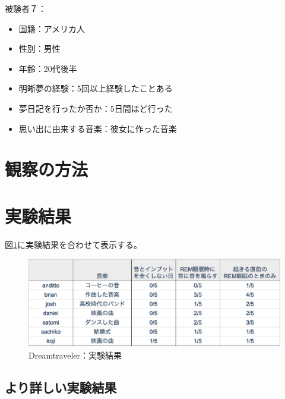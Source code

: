 被験者７：
\begin{itemize}
\item 国籍：アメリカ人
\item 性別：男性
\item 年齢：20代後半
\item 明晰夢の経験：5回以上経験したことある
\item 夢日記を行ったか否か：5日間ほど行った
\item 思い出に由来する音楽：彼女に作った音楽
\end{itemize}

\section{観察の方法}

\section{実験結果}
図\ref{experiment}に実験結果を合わせて表示する。
\begin{figure}[htbp]
\begin{center}
\includegraphics[width=15cm]{eps/eperiment.eps}
\caption{Dreamtraveler：実験結果}
\label{experiment}
\end{center}
\end{figure}

\subsection{より詳しい実験結果}

